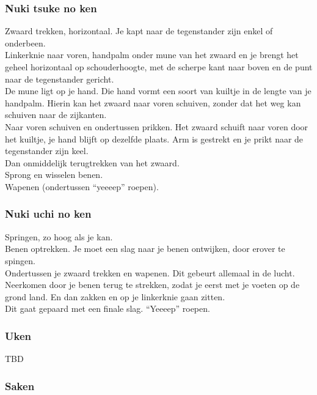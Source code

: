 \subsubsection{Nuki tsuke no ken}

\suwaristart
Zwaard trekken, horizontaal. Je kapt naar de tegenstander zijn enkel of onderbeen.\\
Linkerknie naar voren, handpalm onder mune van het zwaard en je brengt het geheel horizontaal op schouderhoogte, met de scherpe kant naar boven en de punt naar de tegenstander gericht.\\
De mune ligt op je hand. Die hand vormt een soort van kuiltje in de lengte van je handpalm. Hierin kan het zwaard naar voren schuiven, zonder dat het weg kan schuiven naar de zijkanten.\\
Naar voren schuiven en ondertussen prikken. Het zwaard schuift naar voren door het kuiltje, je hand blijft op dezelfde plaats. Arm is gestrekt en je prikt naar de tegenstander zijn keel.\\
Dan onmiddelijk terugtrekken van het zwaard.\\
Sprong en wisselen benen.\\
Wapenen (ondertussen ``yeeeep'' roepen).\\
\suwaristop

\subsubsection{Nuki uchi no ken}

\suwaristart
Springen, zo hoog als je kan.\\
Benen optrekken. Je moet een slag naar je benen ontwijken, door erover te spingen.\\
Ondertussen je zwaard trekken en wapenen. Dit gebeurt allemaal in de lucht.\\
Neerkomen door je benen terug te strekken, zodat je eerst met je voeten op de grond land. En dan zakken en op je linkerknie gaan zitten.\\
Dit gaat gepaard met een finale slag. ``Yeeeep'' roepen.\\
\suwaristop

\subsubsection{Uken}

\suwaristart
TBD

\subsubsection{Saken}

